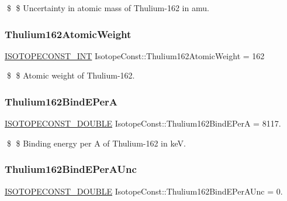 \$ \$ Uncertainty in atomic mass of Thulium-\/162 in amu. \mbox{\label{group___isotope_const-_thulium-_tm162_gacdb550bb80eeee4ec9d5a3f1e7a94e1c}} 
\subsubsection{\texorpdfstring{Thulium162\+Atomic\+Weight}{Thulium162AtomicWeight}}
{\footnotesize\ttfamily \mbox{\hyperlink{group___isotope_const-_macros_ga5f18360b3e99483a35c32d789e62621c}{I\+S\+O\+T\+O\+P\+E\+C\+O\+N\+S\+T\+\_\+\+I\+NT}} Isotope\+Const\+::\+Thulium162\+Atomic\+Weight = 162}

\$ \$ Atomic weight of Thulium-\/162. \mbox{\label{group___isotope_const-_thulium-_tm162_gacf0b47ca6fe131810976076c703e7064}} 
\subsubsection{\texorpdfstring{Thulium162\+Bind\+E\+PerA}{Thulium162BindEPerA}}
{\footnotesize\ttfamily \mbox{\hyperlink{group___isotope_const-_macros_ga8f45a7272ce02c0b4c65c44636ed719a}{I\+S\+O\+T\+O\+P\+E\+C\+O\+N\+S\+T\+\_\+\+D\+O\+U\+B\+LE}} Isotope\+Const\+::\+Thulium162\+Bind\+E\+PerA = 8117.}

\$ \$ Binding energy per A of Thulium-\/162 in keV. \mbox{\label{group___isotope_const-_thulium-_tm162_ga86bb3cc319a95bdf03c0aa874d2c949d}} 
\subsubsection{\texorpdfstring{Thulium162\+Bind\+E\+Per\+A\+Unc}{Thulium162BindEPerAUnc}}
{\footnotesize\ttfamily \mbox{\hyperlink{group___isotope_const-_macros_ga8f45a7272ce02c0b4c65c44636ed719a}{I\+S\+O\+T\+O\+P\+E\+C\+O\+N\+S\+T\+\_\+\+D\+O\+U\+B\+LE}} Isotope\+Const\+::\+Thulium162\+Bind\+E\+Per\+A\+Unc = 0.}

